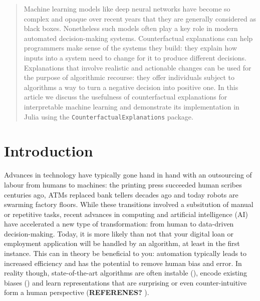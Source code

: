\documentclass{juliacon}
\begin{document}


\maketitle

\begin{abstract}

Machine learning models like deep neural networks have become so complex and opaque over recent years that they are generally considered as black boxes. Nonetheless such models often play a key role in modern automated decision-making systems. Counterfactual explanations can help programmers make sense of the systems they build: they explain how inputs into a system need to change for it to produce different decisions. Explanations that involve realistic and actionable changes can be used for the purpose of algorithmic recourse: they offer individuals subject to algorithms a way to turn a negative decision into positive one. In this article we discuss the usefulness of counterfactual explanations for interpretable machine learning and demonstrate its implementation in Julia using the \verb|CounterfactualExplanations| package.

\end{abstract}

\hypertarget{sec-intro}{%
\section{Introduction}\label{sec-intro}}

Advances in technology have typically gone hand in hand with an
outsourcing of labour from humans to machines: the printing press
succeeded human scribes centuries ago, ATMs replaced bank tellers
decades ago and today robots are swarming factory floors. While these
transitions involved a subsitution of manual or repetitive tasks, recent
advances in computing and artificial intelligence (AI) have accelerated
a new type of transformation: from human to data-driven decision-making.
Today, it is more likely than not that your digital loan or employment
application will be handled by an algorithm, at least in the first
instance. This can in theory be beneficial to you: automation typically
leads to increased efficiency and has the potential to remove human bias
and error. In reality though, state-of-the-art algorithms are often
instable (\cite{goodfellow2014explaining}), encode existing biases
(\cite{buolamwini2018gender}) and learn representations that are
surprising or even counter-intuitive form a human perspective
(\textbf{REFERENES?} \cite{}).
\end{document}
